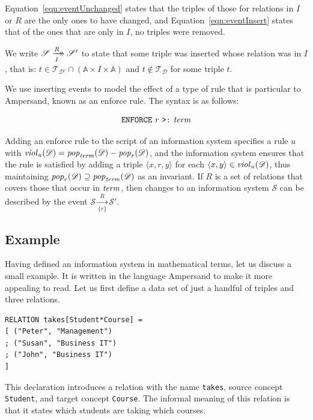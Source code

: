 \documentclass[runningheads]{llncs}
\newcommand{\xrightarrowdbl}[2][]{%
  \xrightarrow[#1]{#2}\mathrel{\mkern-14mu}\rightarrow
}
\newcommand{\id}[1]{\text{\it #1\/}}
\newcommand{\pop}[2]{\id{pop}_{#1}(#2)}
\newcommand{\viol}[2]{\violC{#1}(#2)}
\newcommand{\violC}[1]{\id{viol}_{#1}}
\newcommand{\pair}[2]{\langle{#1},{#2}\rangle}
\newcommand{\triple}[3]{\langle{#1},{#2},{#3}\rangle}
\newcommand{\Atoms}{\mathbb{A}}
\newcommand{\triples}{\mathcal{T}}
\newcommand{\Triple}[3]{#1\times#2\times#3}
\newcommand{\dataset}{\mathscr{D}}
\newcommand{\infsys}{\mathscr{S}}
\begin{document}
   Equation~\ref{eqn:eventUnchanged} states that the triples of those for relations in $I$ or $R$ are the only ones to have changed, and Equation~\ref{eqn:eventInsert} states that of the ones that are only in $I$, no triples were removed.
   
   \begin{definition}
   We write $\infsys \xrightarrowdbl[I]{R} \infsys'$ to state that some triple was inserted whose relation was in $I$, that is:
   $t \in \triples_{\dataset'} \cap (\Triple{\Atoms}{I}{\Atoms})$ and $t \not\in \triples_{\dataset}$ for some triple $t$.
   \end{definition}
   
   We use inserting events to model the effect of a type of rule that is particular to Ampersand, known as an enforce rule.
   The syntax is as follows:
   
\begin{align}
      \text{\tt ENFORCE}\ r\ \text{\tt >:}\ \id{term}\label{enforce ins}
\end{align}

   Adding an enforce rule to the script of an information system specifies a rule $u$ with $\viol{u}{\dataset} = \pop{\id{term}}{\dataset} - \pop{r}{\dataset}$, and the information system ensures that the rule is satisfied by adding a triple $\triple{x}{r}{y}$ for each $\pair{x}{y} \in \viol{u}{\dataset}$, thus maintaining $\pop{r}{\dataset} \supseteq \pop{\id{term}}{\dataset}$ as an invariant.
   If $R$ is a set of relations that covers those that occur in $\id{term}$, then changes to an information system $\infsys$ can be described by the event $\infsys \xrightarrow[\{r\}]{R} \infsys'$.

\subsection{Example}
\label{sct:Example existing IS}
   Having defined an information system in mathematical terms, let us discuss a small example.
   It is written in the language Ampersand to make it more appealing to read.
   Let us first define a data set of just a handful of triples and three relations.
\begin{verbatim}
RELATION takes[Student*Course] =
[ ("Peter", "Management")
; ("Susan", "Business IT")
; ("John", "Business IT")
]
\end{verbatim}
   This declaration introduces a relation with the name \verb#takes#,
   source concept \verb#Student#, and
   target concept \verb#Course#.
   The informal meaning of this relation is that it states which students are taking which courses.
\end{document}
